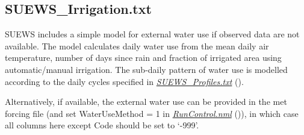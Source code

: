 \documentclass[letterpaper,10pt,english]{sphinxmanual}
\begin{document}
\subsection{SUEWS\_Irrigation.txt}
\label{\detokenize{input_files/SUEWS_SiteInfo/SUEWS_Irrigation:suews-irrigation-txt}}\label{\detokenize{input_files/SUEWS_SiteInfo/SUEWS_Irrigation::doc}}
SUEWS includes a simple model for external water use if observed data
are not available. The model calculates daily water use from the mean
daily air temperature, number of days since rain and fraction of
irrigated area using automatic/manual irrigation. The sub-daily pattern
of water use is modelled according to the daily cycles specified in
{\hyperref[\detokenize{input_files/SUEWS_SiteInfo/SUEWS_Irrigation:SUEWS_Profiles.txt}]{\emph{SUEWS\_Profiles.txt}}} ().

Alternatively, if available, the external water use can be provided in
the met forcing file (and set WaterUseMethod = 1 in
{\hyperref[\detokenize{input_files/SUEWS_SiteInfo/SUEWS_Irrigation:RunControl.nml}]{\emph{RunControl.nml}}} ()), in which case all columns here
except Code should be set to ‘-999’.
\end{document}

